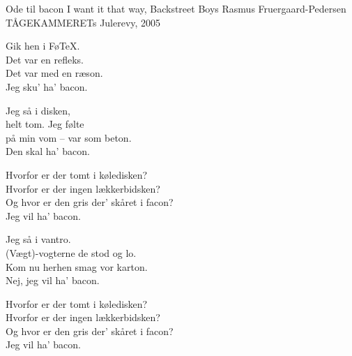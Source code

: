 \begin{song}{Ode til bacon}
  {} %
  {I want it that way, Backstreet Boys} %
  {Rasmus Fruergaard-Pedersen} %
  {TÅGEKAMMERETs Julerevy, 2005} %
  {\NotCCLIed} %

  \begin{SBVerse}
    Gik hen i Fø\TeX.\\
    Det var en refleks.\\
    Det var med en ræson.\\
    Jeg sku’ ha’ bacon.
  \end{SBVerse}

  \begin{SBVerse}
    Jeg så i disken,\\
    helt tom. Jeg følte\\
    på min vom – var som beton.\\
    Den skal ha’ bacon.
  \end{SBVerse}

  \begin{SBChorus}
    Hvorfor er der tomt i køledisken?\\
    Hvorfor er der ingen lækkerbidsken?\\
    Og hvor er den gris der’ skåret i facon?\\
    Jeg vil ha’ bacon.
  \end{SBChorus}

  \begin{SBVerse}
    Jeg så i vantro.\\
    (Vægt)-vogterne de stod og lo.\\
    Kom nu herhen smag vor karton.\\
    Nej, jeg vil ha’ bacon.
  \end{SBVerse}

  \begin{SBChorus}
    Hvorfor er der tomt i køledisken?\\
    Hvorfor er der ingen lækkerbidsken?\\
    Og hvor er den gris der’ skåret i facon?\\
    Jeg vil ha’ bacon.
  \end{SBChorus}



\end{song}
